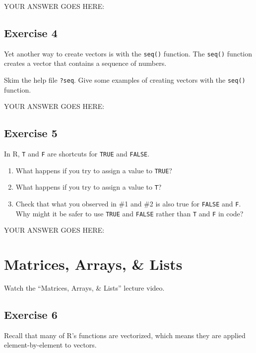 \documentclass[
]{article}
\begin{document}
YOUR ANSWER GOES HERE:

\hypertarget{exercise-4}{%
\subsection{Exercise 4}\label{exercise-4}}

Yet another way to create vectors is with the \texttt{seq()} function.
The \texttt{seq()} function creates a vector that contains a sequence of
numbers.

Skim the help file \texttt{?seq}. Give some examples of creating vectors
with the \texttt{seq()} function.

YOUR ANSWER GOES HERE:

\hypertarget{exercise-5}{%
\subsection{Exercise 5}\label{exercise-5}}

In R, \texttt{T} and \texttt{F} are shortcuts for \texttt{TRUE} and
\texttt{FALSE}.

\begin{enumerate}
\def\labelenumi{\arabic{enumi}.}
\item
  What happens if you try to assign a value to \texttt{TRUE}?
\item
  What happens if you try to assign a value to \texttt{T}?
\item
  Check that what you observed in \#1 and \#2 is also true for
  \texttt{FALSE} and \texttt{F}. Why might it be safer to use
  \texttt{TRUE} and \texttt{FALSE} rather than \texttt{T} and \texttt{F}
  in code?
\end{enumerate}

YOUR ANSWER GOES HERE:

\hypertarget{matrices-arrays-lists}{%
\section{Matrices, Arrays, \& Lists}\label{matrices-arrays-lists}}

Watch the ``Matrices, Arrays, \& Lists'' lecture video.

\hypertarget{exercise-6}{%
\subsection{Exercise 6}\label{exercise-6}}

Recall that many of R's functions are vectorized, which means they are
applied element-by-element to vectors.
\end{document}

